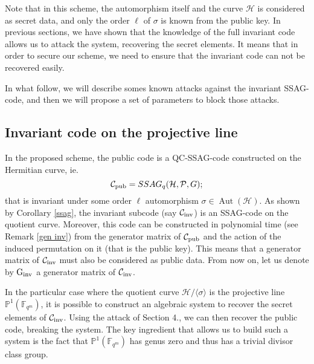 \documentclass[10pt]{article}
\newcommand{\s}{\vspace{0.3cm}}
\newcommand{\C}{\mathcal{C}}
\newcommand{\PP}{\mathbb{P}}
\newcommand{\fqm}{\mathbb{F}_{q^m}}
\newcommand{\PR}{\mathcal{P}}
\newcommand{\Aut}{\operatorname{Aut}}
\begin{document}
\s

Note that in this scheme, the automorphism itself and the curve $\mathcal{H}$ is considered as secret data, and only the order $\ell$ of $\sigma$ is known from the public key. In previous sections, we have shown that the knowledge of the full invariant code allows us to attack the system, recovering the secret elements. It means that in order to secure our scheme, we need to ensure that the invariant code can not be recovered easily. 

\s

In what follow, we will describe somes known attacks against the invariant SSAG-code, and then we will propose a set of parameters to block those attacks.

\s

\subsection{Invariant code on the projective line}

\s

In the proposed scheme, the public code is a QC-SSAG-code constructed on the Hermitian curve, ie. 
\[\mathcal{C}_{\rm pub} = SSAG_q(\mathcal{H},\PR,G);\]
that is invariant under some order $\ell$ automorphism $\sigma \in \Aut(\mathcal{H})$. As shown by Corollary \ref{ssag}, the invariant subcode (say $\mathcal{C}_{\rm inv}$) is an SSAG-code on the quotient curve. Moreover, this code can be constructed in polynomial time (see Remark \ref{gen inv}) from the generator matrix of $\mathcal{C}_{\rm pub}$ and the action of the induced permutation on it (that is the public key). This means that a generator matrix of $\C_{\rm inv}$ must also be considered as public data. From now on, let us denote by $\rm G_{inv}$ a generator matrix of $\mathcal{C}_{\rm inv}$.  

\s

In the particular case where the quotient curve $\mathcal{H}/\langle\sigma\rangle$ is the projective line $\PP^1(\fqm)$, it is possible to construct an algebraic system to recover the secret elements of $\C_{\rm inv}$. Using the attack of Section 4., we can then recover the public code, breaking the system. The key ingredient that allows us to build such a system is the fact that $\PP^1(\fqm)$ has genus zero and thus has a trivial divisor class group. 

\s
\end{document}
